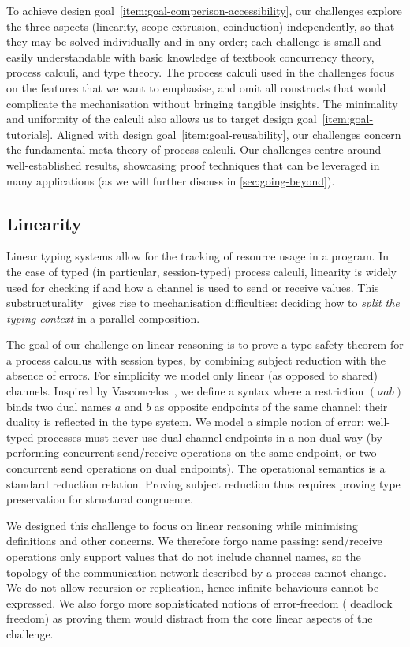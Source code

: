 \documentclass[runningheads]{llncs}
\begin{document}
To achieve design goal~\ref{item:goal-comperison-accessibility}, our challenges explore the three aspects
(linearity, scope extrusion, coinduction) independently, so that they
may be solved individually and in any order; each challenge is small and easily understandable with basic knowledge of
textbook concurrency theory, process calculi, and type theory.  The
process calculi used in the challenges focus on the features that
we want to emphasise, and omit all constructs that would complicate the mechanisation without bringing
tangible insights.  The minimality and uniformity of the
calculi also allows us to target design goal~\ref{item:goal-tutorials}.
Aligned with design goal~\ref{item:goal-reusability}, our challenges concern the fundamental meta-theory of process calculi.
Our challenges centre around well-established results, showcasing proof techniques that can be leveraged in many applications (as we will further discuss in \cref{sec:going-beyond}).

\subsection{Linearity}
Linear typing systems allow for the tracking of resource usage in a program. In
the case of typed (in particular, session-typed) process calculi, linearity is
widely used for checking if and how a channel is used to send or receive values.
This substructurality~\cite[Ch. 1]{Pierce2004-oq} gives rise to mechanisation difficulties: \eg deciding how to \emph{split the
typing context} in a parallel composition.

The goal of our challenge on linear reasoning is to prove a type safety theorem
for a process calculus with session types, by combining subject
reduction with the absence of errors.  For simplicity we model only linear (as
opposed to shared) channels. Inspired by Vasconcelos~\cite{Vasconcelos2012}, we
define a syntax where a restriction $(\bm{\nu} ab)$ binds two dual names $a$
and $b$ as opposite endpoints of the same channel; their duality is
reflected in the type system. We model a simple notion of error: well-typed
processes must never use dual channel endpoints in a non-dual way (\eg by
performing concurrent send/receive operations on the same endpoint, or two
concurrent send operations on dual endpoints).
The operational semantics is a standard reduction relation. Proving subject reduction thus requires proving type preservation for structural congruence.

We designed this challenge to focus on linear reasoning while minimising
definitions and other concerns.  We therefore forgo name passing:
send/receive operations only support values that do not include channel names, so
the topology of the communication network described by a process cannot change.
We do not allow recursion or replication, hence infinite behaviours cannot be
expressed. We also forgo more sophisticated notions of error-freedom (\eg
deadlock freedom) as proving them would distract from the core linear
aspects of the challenge.
\end{document}
